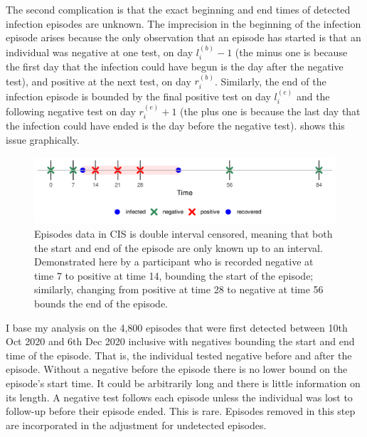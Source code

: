 \documentclass[thesis.tex]{subfiles}
\begin{document}
The second complication is that the exact beginning and end times of detected infection episodes are unknown.
The imprecision in the beginning of the infection episode arises because the only observation that an episode has started is that an individual was negative at one test, on day $l_i^{(b)}-1$ (the minus one is because the first day that the infection could have begun is the day after the negative test), and positive at the next test, on day $r_i^{(b)}$.
Similarly, the end of the infection episode is bounded by the final positive test on day $l_i^{(e)}$ and the following negative test on day $r_i^{(e)}+1$ (the plus one is because the last day that the infection could have ended is the day before the negative test).
 shows this issue graphically.
\begin{figure}
  \centering \includegraphics{cis-perfect-testing/double-interval-censor}
  \caption[Double-interval censoring in CIS data]{Episodes data in CIS is double interval censored, meaning that both the start and end of the episode are only known up to an interval. Demonstrated here by a participant who is recorded negative at time 7 to positive at time 14, bounding the start of the episode; similarly, changing from positive at time 28 to negative at time 56 bounds the end of the episode. \label{perf-test:fig:double-interval-censor}}
\end{figure}

I base my analysis on the 4,800 episodes that were first detected between 10th Oct 2020 and 6th Dec 2020 inclusive with negatives bounding the start and end time of the episode.
That is, the individual tested negative before and after the episode.
Without a negative before the episode there is no lower bound on the episode's start time.
It could be arbitrarily long and there is little information on its length.
A negative test follows each episode unless the individual was lost to follow-up before their episode ended.
This is rare.
Episodes removed in this step are incorporated in the adjustment for undetected episodes.
\end{document}
